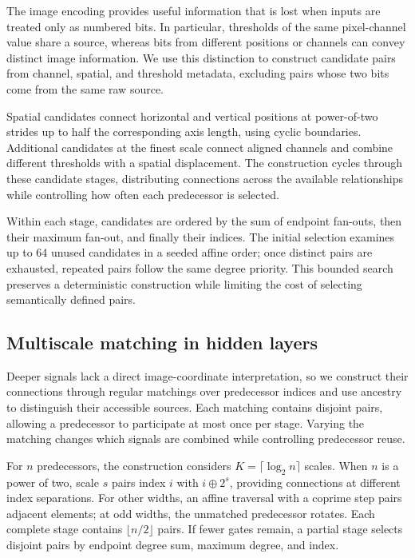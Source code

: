 The image encoding provides useful information that is lost when inputs are treated only as numbered bits. In particular, thresholds of the same pixel-channel value share a source, whereas bits from different positions or channels can convey distinct image information. We use this distinction to construct candidate pairs from channel, spatial, and threshold metadata, excluding pairs whose two bits come from the same raw source.

Spatial candidates connect horizontal and vertical positions at power-of-two strides up to half the corresponding axis length, using cyclic boundaries. Additional candidates at the finest scale connect aligned channels and combine different thresholds with a spatial displacement. The construction cycles through these candidate stages, distributing connections across the available relationships while controlling how often each predecessor is selected.

Within each stage, candidates are ordered by the sum of endpoint fan-outs, then their maximum fan-out, and finally their indices. The initial selection examines up to 64 unused candidates in a seeded affine order; once distinct pairs are exhausted, repeated pairs follow the same degree priority. This bounded search preserves a deterministic construction while limiting the cost of selecting semantically defined pairs.

\subsection{Multiscale matching in hidden layers}

Deeper signals lack a direct image-coordinate interpretation, so we construct their connections through regular matchings over predecessor indices and use ancestry to distinguish their accessible sources. Each matching contains disjoint pairs, allowing a predecessor to participate at most once per stage. Varying the matching changes which signals are combined while controlling predecessor reuse.

For $n$ predecessors, the construction considers $K=\lceil\log_2 n\rceil$ scales. When $n$ is a power of two, scale $s$ pairs index $i$ with $i\mathbin{\oplus}2^s$, providing connections at different index separations. For other widths, an affine traversal with a coprime step pairs adjacent elements; at odd widths, the unmatched predecessor rotates. Each complete stage contains $\lfloor n/2\rfloor$ pairs. If fewer gates remain, a partial stage selects disjoint pairs by endpoint degree sum, maximum degree, and index.

